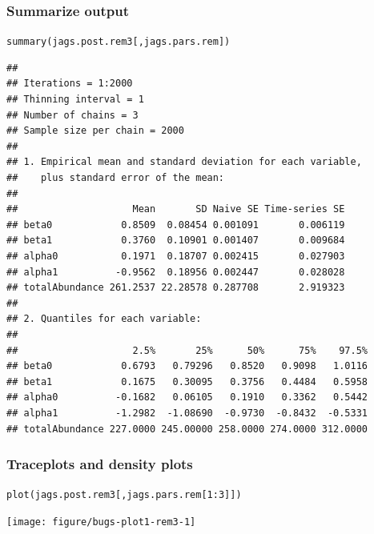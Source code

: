 \documentclass[color=usenames,dvipsnames]{beamer}\usepackage[]{graphicx}\usepackage[]{color}
\makeatletter
\newcommand{\hlnum}[1]{\textcolor[rgb]{0.69,0.494,0}{#1}}%
\newcommand{\hlopt}[1]{\textcolor[rgb]{0,0,0}{#1}}%
\newcommand{\hlstd}[1]{\textcolor[rgb]{0,0,0}{#1}}%
\newcommand{\hlkwd}[1]{\textcolor[rgb]{0.004,0.004,0.506}{#1}}%
\newenvironment{kframe}{%
 \def\at@end@of@kframe{}%
 \ifinner\ifhmode%
  \def\at@end@of@kframe{\end{minipage}}%
  \begin{minipage}{\columnwidth}%
 \fi\fi%
 \def\FrameCommand##1{\hskip\@totalleftmargin \hskip-\fboxsep
 \colorbox{shadecolor}{##1}\hskip-\fboxsep
     \hskip-\linewidth \hskip-\@totalleftmargin \hskip\columnwidth}%
 \MakeFramed {\advance\hsize-\width
   \@totalleftmargin\z@ \linewidth\hsize
   \@setminipage}}%
 {\par\unskip\endMakeFramed%
 \at@end@of@kframe}
\newenvironment{knitrout}{}{} %
\makeatother
\begin{document}
\begin{frame}[fragile]
  \frametitle{Summarize output}
\begin{knitrout}\tiny
{}\color{fgcolor}\begin{kframe}
\begin{alltt}
\hlkwd{summary}\hlstd{(jags.post.rem3[,jags.pars.rem])}
\end{alltt}
\begin{verbatim}
## 
## Iterations = 1:2000
## Thinning interval = 1 
## Number of chains = 3 
## Sample size per chain = 2000 
## 
## 1. Empirical mean and standard deviation for each variable,
##    plus standard error of the mean:
## 
##                    Mean       SD Naive SE Time-series SE
## beta0            0.8509  0.08454 0.001091       0.006119
## beta1            0.3760  0.10901 0.001407       0.009684
## alpha0           0.1971  0.18707 0.002415       0.027903
## alpha1          -0.9562  0.18956 0.002447       0.028028
## totalAbundance 261.2537 22.28578 0.287708       2.919323
## 
## 2. Quantiles for each variable:
## 
##                    2.5%       25%      50%      75%    97.5%
## beta0            0.6793   0.79296   0.8520   0.9098   1.0116
## beta1            0.1675   0.30095   0.3756   0.4484   0.5958
## alpha0          -0.1682   0.06105   0.1910   0.3362   0.5442
## alpha1          -1.2982  -1.08690  -0.9730  -0.8432  -0.5331
## totalAbundance 227.0000 245.00000 258.0000 274.0000 312.0000
\end{verbatim}
\end{kframe}
\end{knitrout}
\end{frame}




\begin{frame}[fragile]
  \frametitle{Traceplots and density plots}
\begin{knitrout}\footnotesize
{}\color{fgcolor}\begin{kframe}
\begin{alltt}
\hlkwd{plot}\hlstd{(jags.post.rem3[,jags.pars.rem[}\hlnum{1}\hlopt{:}\hlnum{3}\hlstd{]])}
\end{alltt}
\end{kframe}

{\centering \texttt{[image: figure/bugs-plot1-rem3-1]} 

}


\end{knitrout}
\end{frame}
\end{document}
